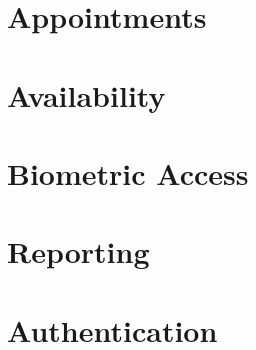 \documentclass[11pt,a4paper,titlepage]{article}
\begin{document}
		
	\section{Appointments}
	
	
	
	\section{Availability}
	
		
	\section{Biometric Access}
	
	
	\section{Reporting}
	
	
	\newpage
	\section{Authentication}
	

	

	
\end{document}
